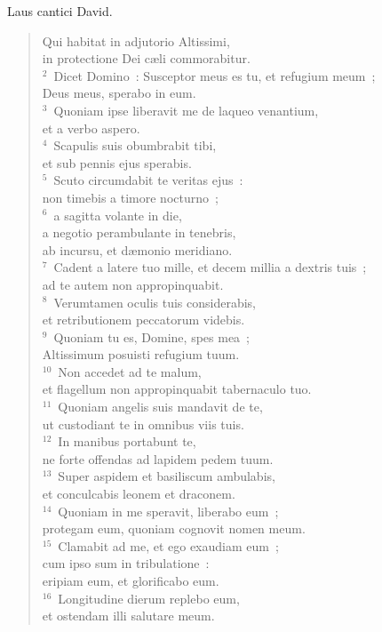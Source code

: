 \bchapter
\lettrine[lines=3,image=true,loversize=0.05,lraise=-0.03]{L}{}aus cantici David. \begin{flushleft}\begin{verse}\vspace{6pt}Qui habitat in adjutorio Altissimi,\\ in protectione Dei c\ae li commorabitur.\\
${}^{2}$~Dicet Domino~: Susceptor meus es tu, et refugium meum~;\\ Deus meus, sperabo in eum.\\
${}^{3}$~Quoniam ipse liberavit me de laqueo venantium,\\ et a verbo aspero.\\
${}^{4}$~Scapulis suis obumbrabit tibi,\\ et sub pennis ejus sperabis.\\
${}^{5}$~Scuto circumdabit te veritas ejus~:\\ non timebis a timore nocturno~;\\
${}^{6}$~a sagitta volante in die,\\ a negotio perambulante in tenebris,\\ ab incursu, et d\ae monio meridiano.\\
${}^{7}$~Cadent a latere tuo mille, et decem millia a dextris tuis~;\\ ad te autem non appropinquabit.\\
${}^{8}$~Verumtamen oculis tuis considerabis,\\ et retributionem peccatorum videbis.\\
${}^{9}$~Quoniam tu es, Domine, spes mea~;\\ Altissimum posuisti refugium tuum.\\
${}^{10}$~Non accedet ad te malum,\\ et flagellum non appropinquabit tabernaculo tuo.\\
${}^{11}$~Quoniam angelis suis mandavit de te,\\ ut custodiant te in omnibus viis tuis.\\
${}^{12}$~In manibus portabunt te,\\ ne forte offendas ad lapidem pedem tuum.\\
${}^{13}$~Super aspidem et basiliscum ambulabis,\\ et conculcabis leonem et draconem.\\
${}^{14}$~Quoniam in me speravit, liberabo eum~;\\ protegam eum, quoniam cognovit nomen meum.\\
${}^{15}$~Clamabit ad me, et ego exaudiam eum~;\\ cum ipso sum in tribulatione~:\\ eripiam eum, et glorificabo eum.\\
${}^{16}$~Longitudine dierum replebo eum,\\ et ostendam illi salutare meum.\end{verse}\end{flushleft}



